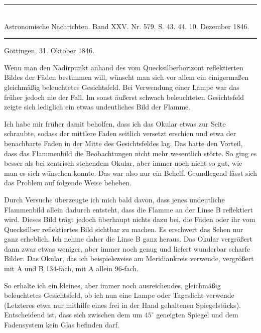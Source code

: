 \clearpage
{}
\begin{center}
\rule{0.55\linewidth}{0.4pt}\\[2pt]
Astronomische Nachrichten. Band XXV. Nr. 579. S. 43. 44. 10. Dezember 1846.\\[2pt]
\rule{0.55\linewidth}{0.4pt}
\end{center}
\begin{flushright}Göttingen, 31. Oktober 1846.\end{flushright}

Wenn man den Nadirpunkt anhand des vom Quecksilberhorizont reflektierten Bildes der Fäden bestimmen will, wünscht man sich vor allem ein einigermaßen gleichmäßig beleuchtetes Gesichtsfeld. Bei Verwendung einer Lampe war das früher jedoch nie der Fall. Im sonst äußerst schwach beleuchteten Gesichtsfeld zeigte sich lediglich ein etwas undeutliches Bild der Flamme.

Ich habe mir früher damit beholfen, dass ich das Okular etwas zur Seite schraubte, sodass der mittlere Faden seitlich versetzt erschien und etwa der benachbarte Faden in der Mitte des Gesichtsfeldes lag. Das hatte den Vorteil, dass das Flammenbild die Beobachtungen nicht mehr wesentlich störte. So ging es besser als bei zentrisch stehendem Okular, aber immer noch nicht so gut, wie man es sich wünschen konnte. Das war also nur ein Behelf. Grundlegend lässt sich das Problem auf folgende Weise beheben.

\begin{center}

\end{center}

Durch Versuche überzeugte ich mich bald davon, dass jenes undeutliche Flammenbild allein dadurch entsteht, dass die Flamme an der Linse B reflektiert wird. Dieses Bild trägt jedoch überhaupt nichts dazu bei, die Fäden oder ihr vom Quecksilber reflektiertes Bild sichtbar zu machen. Es erschwert das Sehen nur ganz erheblich. Ich nehme daher die Linse B ganz heraus. Das Okular vergrößert dann zwar etwas weniger, aber immer noch genug und liefert wunderbar scharfe Bilder. Das Okular, das ich beispielsweise am Meridiankreis verwende, vergrößert mit A und B 134-fach, mit A allein 96-fach.

So erhalte ich ein kleines, aber immer noch ausreichendes, gleichmäßig beleuchtetes Gesichtsfeld, ob ich nun eine Lampe oder Tageslicht verwende (Letzteres etwa nur mithilfe eines frei in der Hand gehaltenen Spiegelstücks). Entscheidend ist, dass sich zwischen dem um $45^\circ$ geneigten Spiegel und dem Fadensystem kein Glas befinden darf.
